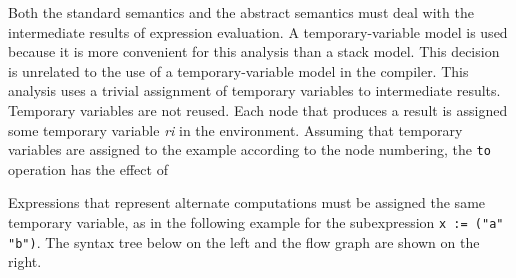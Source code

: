 Both the standard semantics and the abstract semantics must deal with
the intermediate results of expression evaluation.  A
temporary-variable model is used because it is more convenient for
this analysis than a stack model. This decision is unrelated to the
use of a temporary-variable model in the compiler. This analysis uses
a trivial assignment of temporary variables to intermediate
results. Temporary variables are not reused. Each node that produces a
result is assigned some temporary variable \textit{ri} in the
environment. Assuming that temporary variables are assigned to the
example according to the node numbering, the \texttt{to} operation has
the effect of


\noindent
Expressions that represent alternate computations must be assigned the
same temporary variable, as in the following example for the
subexpression \texttt{x := ("a" {\textbar} "b")}. The syntax tree
below on the left and the flow graph are shown on the right.


\begin{center}
\end{center}

